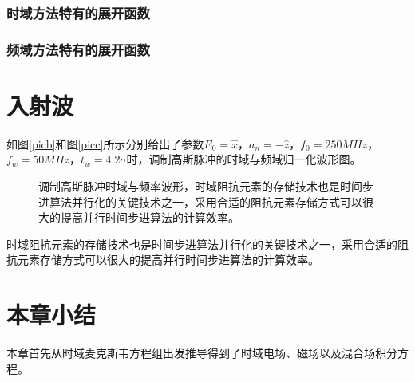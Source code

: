 \subsubsection{时域方法特有的展开函数}

\subsubsection{频域方法特有的展开函数}

\section{入射波}

如图\ref{picb}和图\ref{picc}所示分别给出了参数$E_0=\hat{x}$，$a_n=-\hat{z}$，$f_0=250MHz$，$f_w=50MHz$，$t_w=4.2\sigma$时，调制高斯脉冲的时域与频域归一化波形图。

\begin{figure}[h]
\caption{调制高斯脉冲时域与频率波形，时域阻抗元素的存储技术也是时间步进算法并行化的关键技术之一，采用合适的阻抗元素存储方式可以很大的提高并行时间步进算法的计算效率。}
\label{fig1}
\end{figure}

时域阻抗元素的存储技术也是时间步进算法并行化的关键技术之一，采用合适的阻抗元素存储方式可以很大的提高并行时间步进算法的计算效率。

\section{本章小结}
本章首先从时域麦克斯韦方程组出发推导得到了时域电场、磁场以及混合场积分方程。

